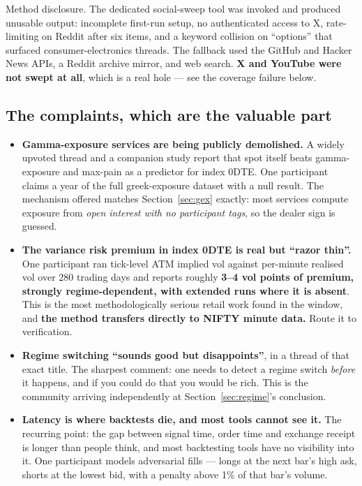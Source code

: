 \documentclass[11pt,a4paper]{article}
\newcommand{\srcnote}[1]{{\footnotesize\color{soft}#1\par}}
\begin{document}
\srcnote{Method disclosure. The dedicated social-sweep tool was invoked and
produced unusable output: incomplete first-run setup, no authenticated access to X,
rate-limiting on Reddit after six items, and a keyword collision on ``options''
that surfaced consumer-electronics threads. The fallback used the GitHub and Hacker
News APIs, a Reddit archive mirror, and web search. \textbf{X and YouTube were not
swept at all}, which is a real hole --- see the coverage failure below.}

\subsection{The complaints, which are the valuable part}

\begin{itemize}
\item \textbf{Gamma-exposure services are being publicly demolished.} A widely
upvoted thread and a companion study report that spot itself beats gamma-exposure
and max-pain as a predictor for index 0DTE. One participant claims a year of the
full greek-exposure dataset with a null result. The mechanism offered matches
Section~\ref{sec:gex} exactly: most services compute exposure from \emph{open
interest with no participant tags}, so the dealer sign is guessed.
\item \textbf{The variance risk premium in index 0DTE is real but ``razor thin''.}
One participant ran tick-level ATM implied vol against per-minute realised vol over
280 trading days and reports roughly \textbf{3--4 vol points of premium, strongly
regime-dependent, with extended runs where it is absent}. This is the most
methodologically serious retail work found in the window, and \textbf{the method
transfers directly to NIFTY minute data.} Route it to verification.
\item \textbf{Regime switching ``sounds good but disappoints''}, in a thread of
that exact title. The sharpest comment: one needs to detect a regime switch
\emph{before} it happens, and if you could do that you would be rich. This is the
community arriving independently at Section~\ref{sec:regime}'s conclusion.
\item \textbf{Latency is where backtests die, and most tools cannot see it.} The
recurring point: the gap between signal time, order time and exchange receipt is
longer than people think, and most backtesting tools have no visibility into it.
One participant models adversarial fills --- longs at the next bar's high ask,
shorts at the lowest bid, with a penalty above 1\% of that bar's volume.

\end{itemize}
\end{document}
